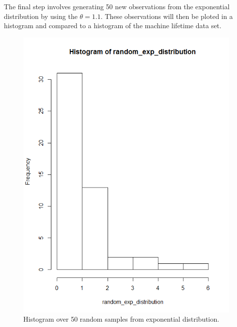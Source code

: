 \documentclass[a4paper,12pt]{article}
\begin{document}
The final step involves generating 50 new observations from the exponential distribution by using the \(\theta = 1.1\). These observations will then be ploted in a histogram and compared to a histogram of the machine lifetime data set.

\begin{figure}[H]
\centering
\begin{minipage}[]{0.4\textwidth}
  \includegraphics[width=\textwidth]{figures/Lab1_A2_hist_exp.png}  
  \caption{Histogram over 50 random samples from exponential distribution.\label{fig:Histogram over 50 random samples from exponential distribution} }
 \end{minipage}
\begin{minipage}[]{0.4\textwidth}

\end{minipage}
\end{figure}
\end{document}
